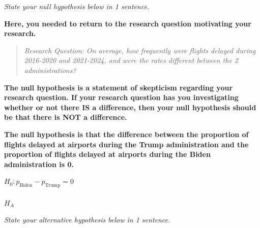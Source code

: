 \documentclass[
  letterpaper,
  DIV=11,
  numbers=noendperiod]{scrartcl}
\makeatletter
\let\oldparagraph\paragraph
\renewcommand{\paragraph}{
    \@ifstar
      \xxxParagraphStar
      \xxxParagraphNoStar
  }
\newcommand{\xxxParagraphStar}[1]{\oldparagraph*{#1}\mbox{}}
\newcommand{\xxxParagraphNoStar}[1]{\oldparagraph{#1}\mbox{}}
\makeatother
\begin{document}
\emph{State your null hypothesis below in 1 sentence.}

\begin{tcolorbox}[enhanced jigsaw, toprule=.15mm, breakable, leftrule=.75mm, bottomrule=.15mm, rightrule=.15mm, colback=white, opacityback=0, colframe=quarto-callout-warning-color-frame, left=2mm, arc=.35mm]

\textbf{Here, you needed to return to the research question motivating
your research.}

\begin{quote}
\emph{Research Question: On average, how frequently were flights delayed
during 2016-2020 and 2021-2024, and were the rates different between the
2 administrations?}
\end{quote}

\textbf{The null hypothesis is a statement of skepticism regarding your
research question. If your research question has you investigating
whether or not there IS a difference, then your null hypothesis should
be that there is NOT a difference.}

\textbf{The null hypothesis is that the difference between the
proportion of flights delayed at airports during the Trump
administration and the proportion of flights delayed at airports during
the Biden administration is 0.}

\(H_0 \colon p_{\text{Biden}}-p_{\text{Trump}}=0\)

\end{tcolorbox}

\paragraph{\texorpdfstring{\(H_A\)}{H\_A}}\label{h_a}

\emph{State your alternative hypothesis below in 1 sentence.}
\end{document}
